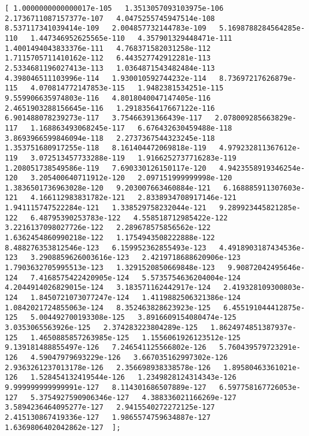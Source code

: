 \documentclass[11pt]{article}
\begin{document}
\begin{Verbatim}[commandchars=\\\{\}]
[ 1.0000000000000017e-105   1.3513057093103975e-106   2.1736711087157377e-107   4.0475255745947514e-108   8.537117341039414e-109   2.004857732144783e-109   5.1698788284564285e-110   1.447346952625565e-110   4.357901329448471e-111   1.4001494043833376e-111   4.768371582031258e-112   1.7115705711410162e-112   6.443527742912281e-113   2.5334681196027413e-113   1.0364871543482484e-113   4.398046511103996e-114   1.930010592744232e-114   8.73697217626879e-115   4.070814772147853e-115   1.9482381534251e-115   9.559906635974803e-116   4.8018040047147405e-116   2.4651903288156645e-116   1.2918356417667122e-116   6.901488078239273e-117   3.75466391366439e-117   2.078009285663829e-117   1.168863493068245e-117   6.676432630459488e-118   3.8693966599846094e-118   2.2737367544323245e-118   1.353751680917255e-118   8.161404472069818e-119   4.979232811367612e-119   3.072513457733288e-119   1.9166252737716283e-119   1.208051738549586e-119   7.690330126150117e-120   4.9423558919346254e-120   3.205400640711912e-120   2.097151999999998e-120   1.3836501736963028e-120   9.203007663460884e-121   6.168885911307603e-121   4.166112983831782e-121   2.8338934708917146e-121   1.941115747522284e-121   1.338529758232044e-121   9.289923445821285e-122   6.48795390253783e-122   4.558518712985422e-122   3.2216137098027726e-122   2.289678575856562e-122   1.6362454860990218e-122   1.1754943508222888e-122   8.488276353812546e-123   6.159952362855493e-123   4.4918903187434536e-123   3.2908859626003616e-123   2.4219718688620906e-123   1.7903632705995513e-123   1.3291520850669848e-123   9.90872042495646e-124   7.4168575422420905e-124   5.5735754636204004e-124   4.2044914026829015e-124   3.183571162442917e-124   2.419328109300803e-124   1.8450721073077247e-124   1.4119882506321386e-124   1.0842021724855063e-124   8.352463828623923e-125   6.455191044412875e-125   5.004492700193308e-125   3.8916609154080474e-125   3.0353065563926e-125   2.374283223804289e-125   1.8624974851387937e-125   1.4650885857263985e-125   1.1556061926123512e-125   9.139181488855497e-126   7.246541125566802e-126   5.760439579723291e-126   4.59047979693229e-126   3.667035162997302e-126   2.9363261237013178e-126   2.356698938338578e-126   1.89580463361021e-126   1.528454132419544e-126   1.2349828124314343e-126   9.999999999999991e-127   8.114301686507889e-127   6.597758167726053e-127   5.3754927590906346e-127   4.388336021166269e-127   3.5894236464095277e-127   2.9415540272272125e-127   2.415130867419336e-127   1.9865574759634887e-127   1.6369806402042862e-127  ];

\end{Verbatim}
\end{document}
